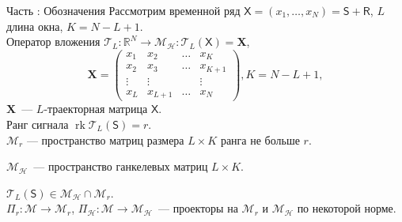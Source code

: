 \documentclass[10pt, ucs, notheorems, handout]{beamer}
\DeclareMathOperator{\rk}{rk}
\newcommand{\tX}[1]{\mathsf{#1}}
\newcommand{\RomanNumeralCaps}[1]
{\MakeUppercase{\romannumeral #1}}
\begin{document}
\begin{frame}{Часть \RomanNumeralCaps{1}: Обозначения}
	Рассмотрим временной ряд $\tX{X}=(x_1, \ldots, x_{N}) = \tX{S} + \tX{R}$, $L$ длина окна, $K=N-L+1$.\\
	\vspace{1em}
	Оператор вложения $\mathcal{T}_L:\mathbb{R}^N \rightarrow \mathcal{M}_{\mathcal{H}}: \mathcal{T}_L (\tX{X}) = \mathbf{X} $,\\
	$$\mathbf{X} = \begin{pmatrix}
		x_1 & x_2 & \ldots & x_{K}\\
		x_2 & x_3 & \ldots & x_{K+1}\\
		\vdots & \vdots & & \vdots\\
		x_{L} & x_{L+1} & \ldots & x_{N}
	\end{pmatrix}, K = N - L + 1,$$
	$\mathbf{X}$~--- $L$-траекторная матрица $\tX{X}$.\\ 
	\vspace{1em}
	Ранг сигнала $\rk\mathcal{T}_L (\tX{S}) = r$.\\
	
	\vspace{1em}
	$\mathcal{M}_{r}$ --- пространство матриц размера $L \times K$ ранга не больше $r$.
	
	$\mathcal{M}_{\mathcal{H}}$~--- пространство ганкелевых матриц $L\times K$.
	
	$\mathcal{T}_L (\tX{S}) \in \mathcal{M}_{\mathcal{H}} \cap \mathcal{M}_{r}$.\\
	\vspace{1em}
	$\Pi_{r}:\mathcal{M}\rightarrow \mathcal{M}_r$,
	$\Pi_{\mathcal{H}}:\mathcal{M} \rightarrow \mathcal{M}_{\mathcal{H}}$~--- проекторы на $\mathcal{M}_{r}$ и $\mathcal{M}_{\mathcal{H}}$ по некоторой норме.
	
	
\end{frame}
\end{document}
